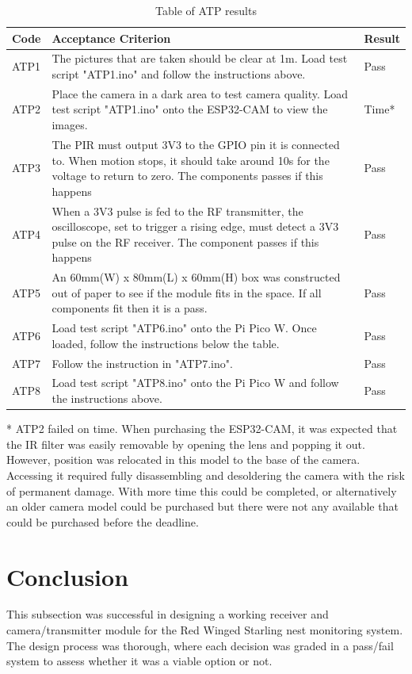 \documentclass[class=report,11pt,crop=false]{standalone}
\begin{document}
\begin{table}[h]
\centering
\begin{tabular}{|p{1cm}|p{13cm}|p{2cm}|}
\hline
\textbf{Code} & \textbf{Acceptance Criterion} & \textbf{Result} \\
\hline
ATP1 & The pictures that are taken should be clear at 1m. Load test script "ATP1.ino" and follow the instructions above. & Pass \\
\hline
ATP2 & Place the camera in a dark area to test camera quality. Load test script "ATP1.ino" onto the ESP32-CAM to view the images. & Time* \\
\hline
ATP3 & The PIR must output 3V3 to the GPIO pin it is connected to. When motion stops, it should take around 10s for the voltage to return to zero. The components passes if this happens & Pass \\ 
\hline
ATP4 & When a 3V3 pulse is fed to the RF transmitter, the oscilloscope, set to trigger a rising edge, must detect a 3V3 pulse on the RF receiver. The component passes if this happens & Pass \\ 
\hline
ATP5 & An 60mm(W) x 80mm(L) x 60mm(H) box was constructed out of paper to see if the module fits in the space. If all components fit then it is a pass. & Pass \\
\hline
ATP6 & Load test script "ATP6.ino" onto the Pi Pico W. Once loaded, follow the instructions below the table. & Pass \\ 
\hline
ATP7 & Follow the instruction in "ATP7.ino". & Pass \\ 
\hline
ATP8 & Load test script "ATP8.ino" onto the Pi Pico W and follow the instructions above. & Pass \\ 
\hline
\end{tabular}
\caption{Table of ATP results}
\label{tab:ATPs_result}
\end{table}

* ATP2 failed on time. When purchasing the ESP32-CAM, it was expected that the IR filter was easily removable by opening the lens and popping it out. However, position was relocated in this model to the base of the camera. Accessing it required fully disassembling and desoldering the camera with the risk of permanent damage. With more time this could be completed, or alternatively an older camera model could be purchased but there were not any available that could be purchased before the deadline. 

\section{Conclusion} \label{sc: HW_C}
This subsection was successful in designing a working receiver and camera/transmitter module for the Red Winged Starling nest monitoring system. The design process was thorough, where each decision was graded in 
a pass/fail system to assess whether it was a viable option or not. 
\end{document}
